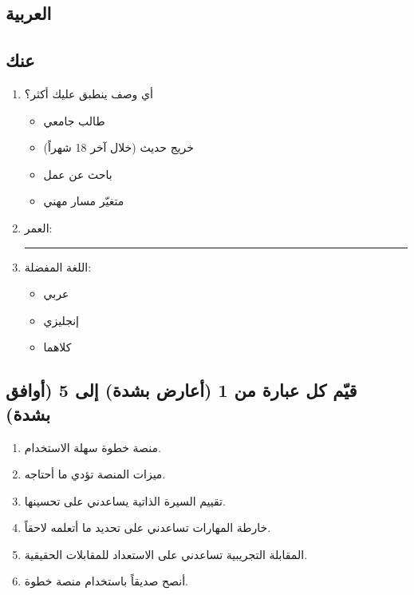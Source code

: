﻿\documentclass[11pt]{article}
\begin{document}
\begin{arabic}
\section*{العربية}

\subsection*{عنك}

\begin{enumerate}
  \item أي وصف ينطبق عليك أكثر؟
    \begin{itemize}
      \item[$\square$] طالب جامعي
      \item[$\square$] خريج حديث (خلال آخر 18 شهراً)
      \item[$\square$] باحث عن عمل
      \item[$\square$] متغيّر مسار مهني
    \end{itemize}
  \item العمر: \rule{4cm}{0.4pt}
  \item اللغة المفضلة:
    \begin{itemize}
      \item[$\square$] عربي \quad
      \item[$\square$] إنجليزي \quad
      \item[$\square$] كلاهما
    \end{itemize}
\end{enumerate}

\subsection*{قيّم كل عبارة من 1 (أعارض بشدة) إلى 5 (أوافق بشدة)}

\begin{enumerate}[start=4]
  \item منصة خطوة سهلة الاستخدام. \hfill {}    
  \item ميزات المنصة تؤدي ما أحتاجه. \hfill {}    
  \item تقييم السيرة الذاتية يساعدني على تحسينها. \hfill {}    
  \item خارطة المهارات تساعدني على تحديد ما أتعلمه لاحقاً. \hfill {}    
  \item المقابلة التجريبية تساعدني على الاستعداد للمقابلات الحقيقية. \hfill {}    
  \item أنصح صديقاً باستخدام منصة خطوة. \hfill {}    
\end{enumerate}


\end{arabic}
\end{document}
